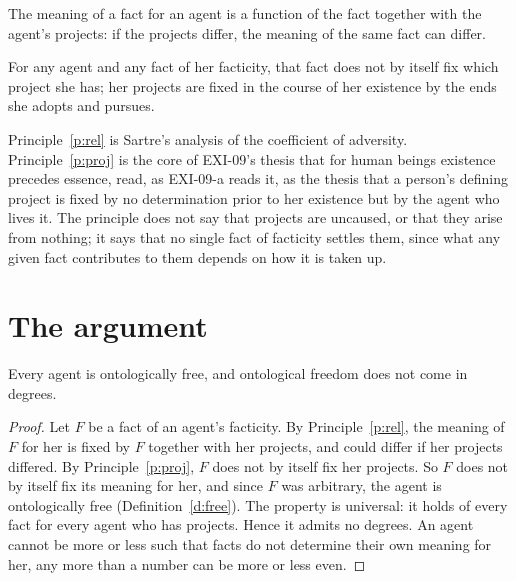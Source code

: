 \documentclass{situationist-preprint}
\begin{document}
\begin{principle}\label{p:rel}
The meaning of a fact for an agent is a function of the fact together with the agent's projects: if the projects differ, the meaning of the same fact can differ.
\end{principle}

\begin{principle}\label{p:proj}
For any agent and any fact of her facticity, that fact does not by itself fix which project she has; her projects are fixed in the course of her existence by the ends she adopts and pursues.
\end{principle}

Principle~\ref{p:rel} is Sartre's analysis of the coefficient of adversity. Principle~\ref{p:proj} is the core of EXI-09's thesis that for human beings existence precedes essence, read, as EXI-09-a reads it, as the thesis that a person's defining project is fixed by no determination prior to her existence but by the agent who lives it. The principle does not say that projects are uncaused, or that they arise from nothing; it says that no single fact of facticity settles them, since what any given fact contributes to them depends on how it is taken up.

\section{The argument}

\begin{lemma}[Absoluteness]\label{l:abs}
Every agent is ontologically free, and ontological freedom does not come in degrees.
\end{lemma}

\begin{proof}
Let $F$ be a fact of an agent's facticity. By Principle~\ref{p:rel}, the meaning of $F$ for her is fixed by $F$ together with her projects, and could differ if her projects differed. By Principle~\ref{p:proj}, $F$ does not by itself fix her projects. So $F$ does not by itself fix its meaning for her, and since $F$ was arbitrary, the agent is ontologically free (Definition~\ref{d:free}). The property is universal: it holds of every fact for every agent who has projects. Hence it admits no degrees. An agent cannot be more or less such that facts do not determine their own meaning for her, any more than a number can be more or less even.
\end{proof}
\end{document}
